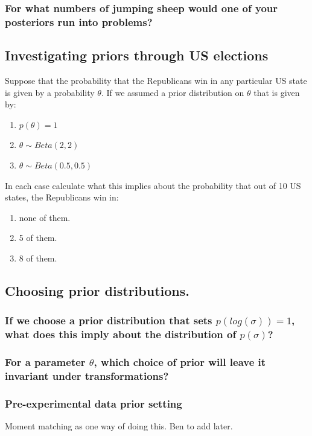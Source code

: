 \documentclass[11pt,fullpage]{book}
\begin{document}
\subsubsection{For what numbers of jumping sheep would one of your posteriors run into problems?}

\subsection{Investigating priors through US elections}
Suppose that the probability that the Republicans win in any particular US state is given by a probability $\theta$. If we assumed a prior distribution on $\theta$ that is given by:

\begin{enumerate}
\item $p(\theta) = 1$
\item $\theta\sim Beta(2,2)$
\item $\theta\sim Beta(0.5,0.5)$
\end{enumerate}

In each case calculate what this implies about the probability that out of 10 US states, the Republicans win in:\\

\begin{enumerate}
\item none of them.
\item 5 of them.
\item 8 of them.
\end{enumerate}

\subsection{Choosing prior distributions.}
\subsubsection{If we choose a prior distribution that sets $p(log(\sigma))=1$, what does this imply about the distribution of $p(\sigma)$?}

\subsubsection{For a parameter $\theta$, which choice of prior will leave it invariant under transformations?}

\subsubsection{Pre-experimental data prior setting}
Moment matching as one way of doing this. Ben to add later.
\end{document}
